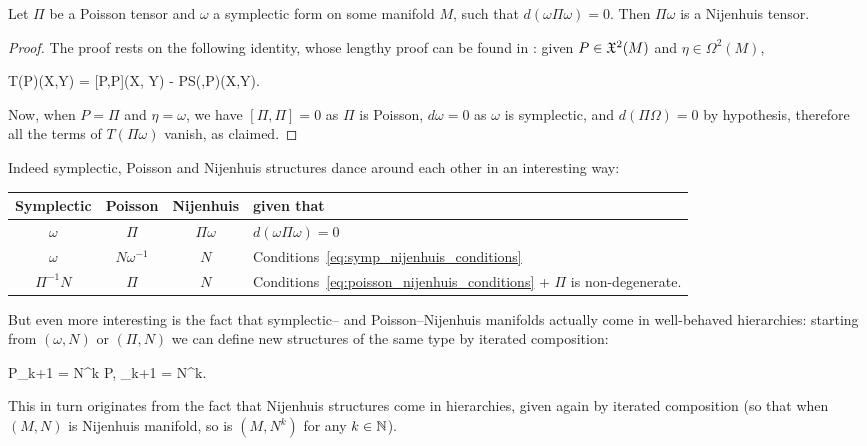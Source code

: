 \documentclass[main.tex]{subfiles}
\begin{document}
\begin{proposition}
	Let $\Pi$ be a Poisson tensor and $\omega$ a symplectic form on some manifold $M$, such that $d(\omega\Pi\omega) = 0$. Then $\Pi\omega$ is a Nijenhuis tensor.
\end{proposition}
\begin{proof}
	The proof rests on the following identity, whose lengthy proof can be found in \cite[Appendix A]{magri1984geometrical}: given $P \in \mathfrak{X}^2(M)$ and $\eta \in \Omega^2(M)$,
	\begin{eqalign}
		T(P\eta)(X,Y) = [P,P](\eta X, \eta Y) - PS(\eta,P\eta)(X,Y).
	\end{eqalign}
	Now, when $P = \Pi$ and $\eta = \omega$, we have $[\Pi, \Pi] = 0$ as $\Pi$ is Poisson, $d\omega = 0$ as $\omega$ is symplectic, and $d(\Pi\Omega) = 0$ by hypothesis, therefore all the terms of $T(\Pi\omega)$ vanish, as claimed.
\end{proof}

Indeed symplectic, Poisson and Nijenhuis structures dance around each other in an interesting way:

\begin{center}
	\begin{tabular}{c|c|c|l}
		\textbf{Symplectic} & \textbf{Poisson} & \textbf{Nijenhuis} & \textbf{given that}\\[1ex]
		\hline
		$\omega$ & $\Pi$ & $\Pi\omega$ & $d(\omega\Pi\omega) = 0$\\[1ex]
		$\omega$ & $N\omega^{-1}$ & $N$ & Conditions~\eqref{eq:symp_nijenhuis_conditions}\\
		$\Pi^{-1}N$ & $\Pi$ & $N$ & Conditions~\eqref{eq:poisson_nijenhuis_conditions} + $\Pi$ is non-degenerate.
	\end{tabular}
\end{center}

But even more interesting is the fact that symplectic-- and Poisson--Nijenhuis manifolds actually come in well-behaved hierarchies: starting from $(\omega, N)$ or $(\Pi, N)$ we can define new structures of the same type by iterated composition:
\begin{eqalign}
	P_{k+1} = N^k P, \quad \Omega_{k+1} = \Omega N^k.
\end{eqalign}
This in turn originates from the fact that Nijenhuis structures come in hierarchies, given again by iterated composition (so that when $(M,N)$ is Nijenhuis manifold, so is $(M, N^k)$ for any $k \in \mathbb{N}$).

\end{document}
